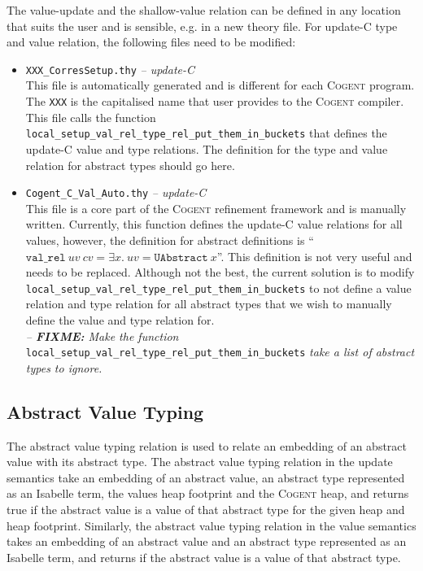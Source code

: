 \documentclass{article}
\newcommand{\cogent}{\textsc{Cogent}\xspace}
\newcommand{\Cogent}{\textsc{Cogent}\xspace}
\begin{document}
The value-update and the shallow-value relation can be defined in any
location that suits the user and is sensible,
e.g. in a new theory file.
For update-C type and value relation, the following files need to be modified:
\begin{itemize}
\item \texttt{XXX\_CorresSetup.thy} \textit{-- update-C}\\
This file is automatically generated and is different for each \cogent program.
The \texttt{XXX} is the capitalised name that user provides to the \cogent
compiler.
This file calls the function\\
\texttt{local\_setup\_val\_rel\_type\_rel\_put\_them\_in\_buckets} that
defines the update-C value and type relations.
The definition for the type and value relation for abstract types should go here.
\item \texttt{Cogent\_C\_Val\_Auto.thy} \textit{-- update-C}\\
This file is a core part of the \Cogent refinement framework and is
manually written.
Currently, this function defines the update-C value relations for all values,
however, the definition for abstract definitions is
{``$\mathtt{val\_rel}~\mathit{uv}~\mathit{cv} = \exists x.\ uv =
\mathtt{UAbstract}~x$''}.
This definition is not very useful and needs to be replaced.
Although not the best, the current solution is to modify\\
\verb!local_setup_val_rel_type_rel_put_them_in_buckets! to not define a
value relation and type relation for all abstract types that we
wish to manually define the value and type relation for.\\
\textit{-- \textbf{FIXME:} Make the function}
\texttt{local\_setup\_val\_rel\_type\_rel\_put\_them\_in\_buckets}
\textit{take a list of abstract types to ignore.}
\end{itemize}

\subsection{Abstract Value Typing}
The abstract value typing relation is used to relate an embedding of an
abstract value with its abstract type.
The abstract value typing relation in the update semantics take an
embedding of an abstract value, an abstract type represented as an Isabelle
term, the values heap footprint and the \Cogent heap,
and returns true if the abstract value is a value of that abstract type for
the given heap and heap footprint.
Similarly, the abstract value typing relation in the value semantics takes
an embedding of an abstract value and an abstract type represented as an
Isabelle term,
and returns if the abstract value is a value of that abstract type.
\end{document}
